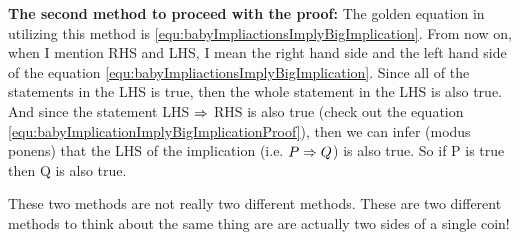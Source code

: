 \textbf{The second method to proceed with the proof:} The golden equation in utilizing this method is \ref{equ:babyImpliactionsImplyBigImplication}. From now on, when I mention RHS and LHS, I mean the right hand side and the left hand side of the equation \ref{equ:babyImpliactionsImplyBigImplication}. Since all of the statements in the LHS is true, then the whole statement in the LHS is also true. And since the statement LHS $ \Rightarrow $ RHS is also true (check out the equation \ref{equ:babyImplicationImplyBigImplicationProof}), then we can infer (modus ponens) that the LHS of the implication (i.e. $ P \Rightarrow Q $) is also true. So if P is true then Q is also true.

These two methods are not really two different methods. These are two different methods to think about the same thing are are actually two sides of a single coin!

